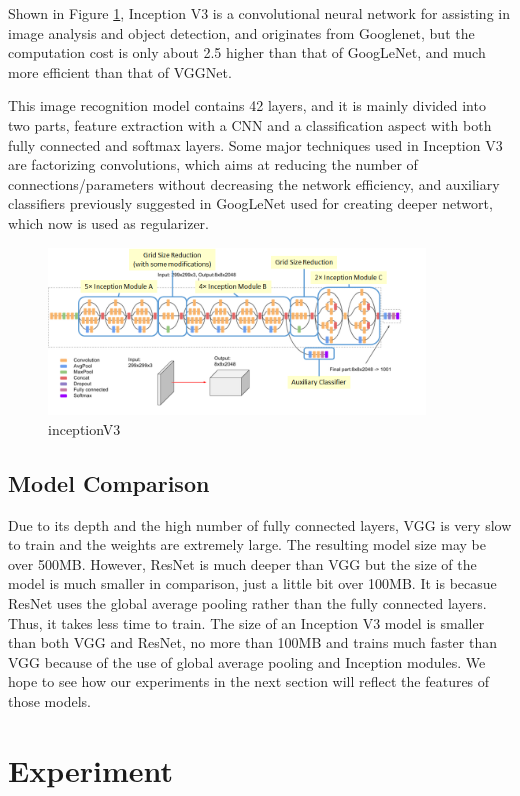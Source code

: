 \documentclass{article}
\begin{document}
Shown in Figure \ref{fig:inception}, Inception V3\cite{inception}\cite{inception2} is a convolutional neural network for assisting in image analysis and object detection, and originates from Googlenet, but the computation cost is only about 2.5 higher than that of GoogLeNet, and much more efficient than that of VGGNet.

This image recognition model contains 42 layers, and it is mainly divided into two parts, feature extraction with a CNN and a classification aspect with both fully connected and softmax layers. Some major techniques used in Inception V3 are factorizing convolutions, which aims at  reducing the number of connections/parameters without decreasing the network efficiency, and
auxiliary classifiers previously suggested in GoogLeNet used for creating deeper networt, which now is used as regularizer.

 \begin{figure}[h!]
    \centering
    \includegraphics[width=10cm]{inception.png}
    \caption{inceptionV3}
    \label{fig:inception}
\end{figure}

\subsection{Model Comparison}
Due to its depth and the high number of fully connected layers, VGG is very slow to train and the weights are extremely large. The resulting model size may be over 500MB. However, ResNet is much deeper than VGG but the size of the model is much smaller in comparison, just a little bit over 100MB. It is becasue ResNet uses the global average pooling rather than the fully connected layers. Thus, it takes less time to train. The size of an Inception V3 model is smaller than both VGG and ResNet, no more than 100MB and trains much faster than VGG because of the use of global average pooling and Inception modules. We hope to see how our experiments in the next section will reflect the features of those models.


\section{Experiment}
\end{document}
